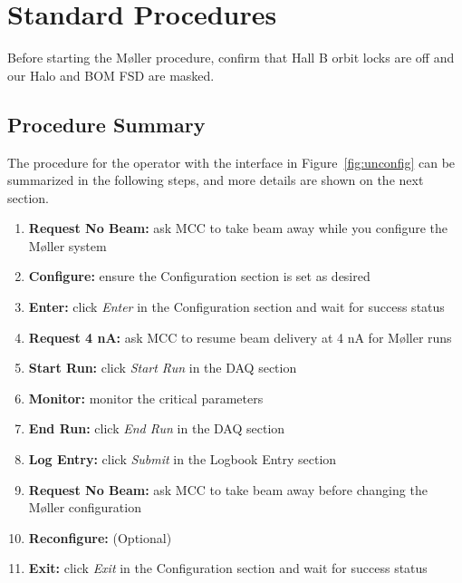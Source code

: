 \documentclass[amsmath,amssymb,notitlepage,12pt]{revtex4}
\begin{document}
\newpage

\section{Standard Procedures}\label{sec:user}
Before starting the M{\o}ller procedure, confirm that Hall B orbit locks are off and our Halo and BOM FSD are masked.
\subsection{Procedure Summary}
The procedure for the operator with the interface in Figure~\ref{fig:unconfig} can be summarized in the following steps, and more details are shown on the next section.
\begin{enumerate}
\vspace{-4mm}\item {\bf Request No Beam:}  ask MCC to take beam away while you configure the M{\o}ller system
\vspace{-4mm}\item {\bf Configure:}  ensure the Configuration section is set as desired
\vspace{-4mm}\item {\bf Enter:} click {\em Enter} in the Configuration section and wait for success status
\vspace{-4mm}\item {\bf Request 4 nA:} ask MCC to resume beam delivery at 4 nA for M{\o}ller runs
\vspace{-4mm}\item {\bf Start Run:} click {\em Start Run} in the DAQ section
\vspace{-4mm}\item {\bf Monitor:} monitor the critical parameters
\vspace{-4mm}\item {\bf End Run:} click {\em End Run} in the DAQ section
\vspace{-4mm}\item {\bf Log Entry:} click {\em Submit} in the Logbook Entry section 
\vspace{-4mm}\item {\bf Request No Beam:} ask MCC to take beam away before changing the M{\o}ller configuration
\vspace{-4mm}\item {\bf Reconfigure:} (Optional)
\vspace{-4mm}\item {\bf Exit:} click {\em Exit} in the Configuration section and wait for success status
\end{enumerate}
\end{document}
